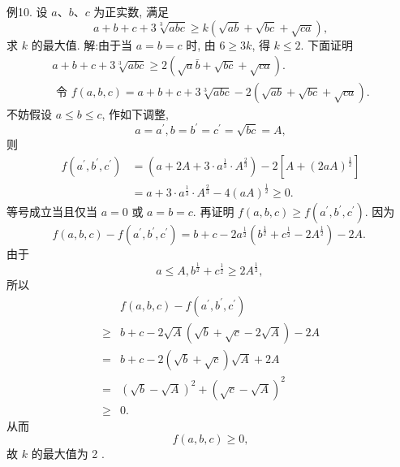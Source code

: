 例10. 设 $a 、 b 、 c$ 为正实数, 满足
$$
a+b+c+3 \sqrt[3]{a b c} \geqslant k(\sqrt{a b}+\sqrt{b c}+\sqrt{c a}),
$$
求 $k$ 的最大值.
解:由于当 $a=b=c$ 时, 由 $6 \geqslant 3 k$, 得 $k \leqslant 2$. 下面证明
$$
\begin{gathered}
a+b+c+3 \sqrt[3]{a b c} \geqslant 2(\sqrt{a} \bar{b}+\sqrt{b c}+\sqrt{c a}) . \\
\text { 令 } f(a, b, c)=a+b+c+3 \sqrt[3]{a b c}-2(\sqrt{a b}+\sqrt{b c}+\sqrt{c a}) .
\end{gathered}
$$
不妨假设 $a \leqslant b \leqslant c$, 作如下调整,
$$
a=a^{\prime}, b=b^{\prime}=c^{\prime}=\sqrt{b c}=A,
$$
则
$$
\begin{aligned}
f\left(a^{\prime}, b^{\prime}, c^{\prime}\right) & =\left(a+2 A+3 \cdot a^{\frac{1}{3}} \cdot A^{\frac{2}{3}}\right)-2\left[A+(2 a A)^{\frac{1}{2}}\right] \\
& =a+3 \cdot a^{\frac{1}{3}} \cdot A^{\frac{2}{3}}-4(a A)^{\frac{1}{2}} \geqslant 0 .
\end{aligned}
$$
等号成立当且仅当 $a=0$ 或 $a=b=c$.
再证明 $f(a, b, c) \geqslant f\left(a^{\prime}, b^{\prime}, c^{\prime}\right)$. 因为
$$
f(a, b, c)-f\left(a^{\prime}, b^{\prime}, c^{\prime}\right)=b+c-2 a^{\frac{1}{2}}\left(b^{\frac{1}{2}}+c^{\frac{1}{2}}-2 A^{\frac{1}{2}}\right)-2 A \text {. }
$$
由于
$$
a \leqslant A, b^{\frac{1}{2}}+c^{\frac{1}{2}} \geqslant 2 A^{\frac{1}{2}} \text {, }
$$
所以
$$
\begin{aligned}
& f(a, b, c)-f\left(a^{\prime}, b^{\prime}, c^{\prime}\right) \\
\geqslant & b+c-2 \sqrt{A}(\sqrt{b}+\sqrt{c}-2 \sqrt{A})-2 A \\
= & b+c-2(\sqrt{b}+\sqrt{c}) \sqrt{A}+2 A \\
= & (\sqrt{b}-\sqrt{A})^2+(\sqrt{c}-\sqrt{A})^2 \\
\geqslant & 0 .
\end{aligned}
$$
从而
$$
f(a, b, c) \geqslant 0,
$$
故 $k$ 的最大值为 2 .



